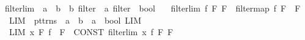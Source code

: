 \begin{isabellebody}
\isamarkuptrue%
%
\endisatagdocument
{\isafolddocument}%
%
\isadelimdocument
%
\endisadelimdocument
{}\isamarkupfalse%
\ filterlim\ {\isacharcolon}{\kern0pt}{\isacharcolon}{\kern0pt}\ {\isachardoublequoteopen}{\isacharparenleft}{\kern0pt}{\isacharprime}{\kern0pt}a\ {\isasymRightarrow}\ {\isacharprime}{\kern0pt}b{\isacharparenright}{\kern0pt}\ {\isasymRightarrow}\ {\isacharprime}{\kern0pt}b\ filter\ {\isasymRightarrow}\ {\isacharprime}{\kern0pt}a\ filter\ {\isasymRightarrow}\ bool{\isachardoublequoteclose}\ \isanewline
\ \ {\isachardoublequoteopen}filterlim\ f\ F{}\ F{}\ {\isasymlongleftrightarrow}\ filtermap\ f\ F{}\ {\isasymle}\ F{}{\isachardoublequoteclose}\isanewline
\isanewline
{}\isamarkupfalse%
\isanewline
\ \ {\isachardoublequoteopen}{\isacharunderscore}{\kern0pt}LIM{\isachardoublequoteclose}\ {\isacharcolon}{\kern0pt}{\isacharcolon}{\kern0pt}\ {\isachardoublequoteopen}pttrns\ {\isasymRightarrow}\ {\isacharprime}{\kern0pt}a\ {\isasymRightarrow}\ {\isacharprime}{\kern0pt}b\ {\isasymRightarrow}\ {\isacharprime}{\kern0pt}a\ {\isasymRightarrow}\ bool{\isachardoublequoteclose}\ {\isacharparenleft}{\kern0pt}{\isachardoublequoteopen}{\isacharparenleft}{\kern0pt}{}LIM\ {\isacharparenleft}{\kern0pt}{\isacharunderscore}{\kern0pt}{\isacharparenright}{\kern0pt}{\isacharslash}{\kern0pt}\ {\isacharparenleft}{\kern0pt}{\isacharunderscore}{\kern0pt}{\isacharparenright}{\kern0pt}{\isachardot}{\kern0pt}{\isacharslash}{\kern0pt}\ {\isacharparenleft}{\kern0pt}{\isacharunderscore}{\kern0pt}{\isacharparenright}{\kern0pt}\ {\isacharcolon}{\kern0pt}{\isachargreater}{\kern0pt}\ {\isacharparenleft}{\kern0pt}{\isacharunderscore}{\kern0pt}{\isacharparenright}{\kern0pt}{\isacharparenright}{\kern0pt}{\isachardoublequoteclose}\ {\isacharbrackleft}{\kern0pt}{}{}{}{}{\isacharcomma}{\kern0pt}\ {}{}{\isacharcomma}{\kern0pt}\ {}{\isacharcomma}{\kern0pt}\ {}{}{\isacharbrackright}{\kern0pt}\ {}{}{\isacharparenright}{\kern0pt}\isanewline
\isanewline
{}\isamarkupfalse%
\isanewline
\ \ {\isachardoublequoteopen}LIM\ x\ F{}{\isachardot}{\kern0pt}\ f\ {\isacharcolon}{\kern0pt}{\isachargreater}{\kern0pt}\ F{}{\isachardoublequoteclose}\ {\isacharequal}{\kern0pt}{\isacharequal}{\kern0pt}\ {\isachardoublequoteopen}CONST\ filterlim\ {\isacharparenleft}{\kern0pt}{\isasymlambda}x{\isachardot}{\kern0pt}\ f{\isacharparenright}{\kern0pt}\ F{}\ F{}{\isachardoublequoteclose}\isanewline

\end{isabellebody}
